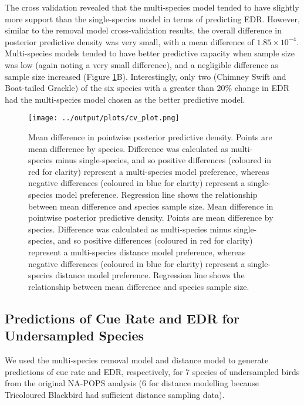 \documentclass[12pt]{article}
\begin{document}
\par The cross validation revealed that the multi-species model tended to have slightly more support than the single-species model in terms of predicting EDR.
However, similar to the removal model cross-validation results, the overall difference in posterior predictive density was very small, with a mean difference of $1.85 \times 10^{-4}$.
Multi-species models tended to have better predictive capacity when sample size was low (again noting a very small difference), and a negligible difference as sample size increased (Figure \ref{fig:cv}B).
Interestingly, only two (Chimney Swift and Boat-tailed Grackle) of the six species with a greater than 20\% change in EDR had the multi-species model chosen as the better predictive model.

\begin{figure}[h!]
	\texttt{[image: ../output/plots/cv\_plot.png]}
	\caption{Mean difference in pointwise posterior predictive density. Points are mean difference by species. Difference was calculated as multi-species minus single-species, and so positive differences (coloured in red for clarity) represent a multi-species model preference, whereas negative differences (coloured in blue for clarity) represent a single-species model preference. Regression line shows the relationship between mean difference and species sample size. Mean difference in pointwise posterior predictive density. Points are mean difference by species. Difference was calculated as multi-species minus single-species, and so positive differences (coloured in red for clarity) represent a multi-species distance model preference, whereas negative differences (coloured in blue for clarity) represent a single-species distance model preference. Regression line shows the relationship between mean difference and species sample size.}
	\label{fig:cv}
\end{figure}

\subsection{Predictions of Cue Rate and EDR for Undersampled Species}

\par We used the multi-species removal model and distance model to generate predictions of cue rate and EDR, respectively, for 7 species of undersampled birds from the original NA-POPS analysis (6 for distance modelling because Tricoloured Blackbird had sufficient distance sampling data).
\end{document}
